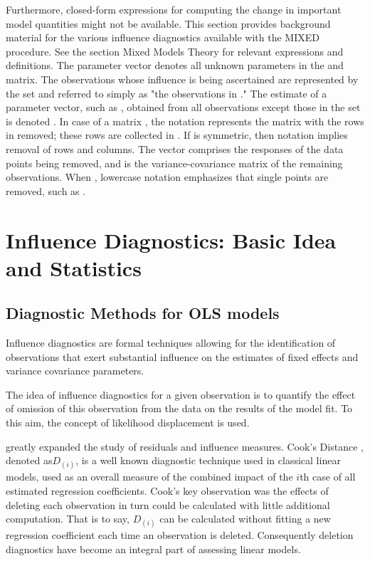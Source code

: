 \documentclass[12pt, a4paper]{report}
\theoremstyle{plain}
\theoremstyle{definition}
\theoremstyle{remark}
\begin{document}
Furthermore, closed-form expressions for computing the change in important model quantities might not be available.
This section provides background material for the various influence diagnostics available with the MIXED procedure. See the section Mixed Models Theory for relevant expressions and definitions. The parameter vector  denotes all unknown parameters in the  and  matrix.
The observations whose influence is being ascertained are represented by the set  and referred to simply as "the observations in ." The estimate of a parameter vector, such as , obtained from all observations except those in the set  is denoted . In case of a matrix , the notation  represents the matrix with the rows in  removed; these rows are collected in . If  is symmetric, then notation  implies removal of rows and columns. The vector  comprises the responses of the data points being removed, and  is the variance-covariance matrix of the remaining observations. When , lowercase notation emphasizes that single points are removed, such as .

\newpage



\section{Influence Diagnostics: Basic Idea and Statistics} %

\subsection{Diagnostic Methods for OLS models}
Influence diagnostics are formal techniques allowing for the identification of observations that exert substantial 
influence on the estimates of fixed effects and variance covariance parameters. 

The idea of influence diagnostics for a given observation is to quantify the effect of omission of this observation 
from the data on the results of the model fit. To this aim, the concept of likelihood displacement is used. 



\citet{cook77} greatly expanded the study of residuals and influence measures. Cook's Distance , denoted as$D_{(i)}$, is a well known diagnostic technique used in classical linear models, used as an overall measure of the combined impact of the $i$th case of all estimated regression coefficients. Cook's key observation was the effects of deleting each observation in turn could be calculated with little additional computation. That is to say, $D_{(i)}$ can be calculated without fitting a new regression coefficient each time an observation is deleted.  Consequently deletion diagnostics have become an integral part of assessing linear models. 
\end{document}
